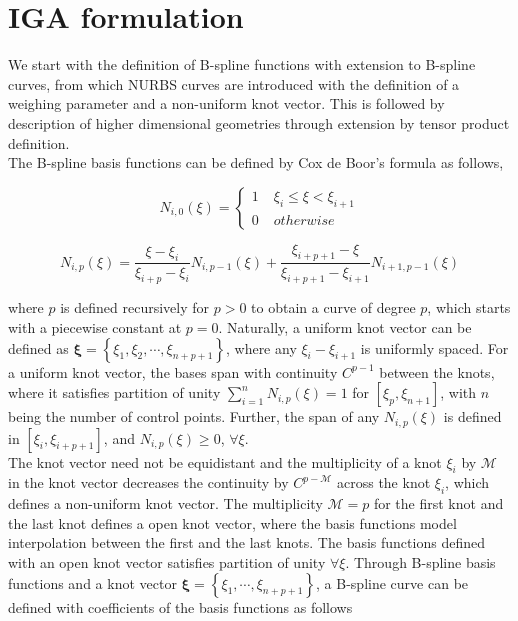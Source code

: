 \chapter{IGA formulation}
\cite{ha2015}
We start with the definition of B-spline functions with extension to B-spline curves, from which NURBS curves are introduced with the definition of a weighing parameter and a non-uniform knot vector. This is followed by description of higher dimensional geometries through extension by tensor product definition.\\
 
 The B-spline basis functions can be defined by Cox de Boor's formula as follows,
 
\begin{equation}
{N_{i,0}\left( \xi  \right)} = \left\{ {\begin{array}{cl}
   1 & {\;{\xi _i} \le \xi  < {\xi _{i + 1}}}  \\
   0 & {\;otherwise}
\end{array}} \right.
\end{equation}

\begin{equation}
{N_{i,p}\left( \xi  \right)} = \frac{{\xi  - \xi_{i} }}{{{\xi _{i + p}} - {\xi _i}}}{N_{i,p - 1}\left( \xi  \right)} + \frac{{{\xi _{i + p + 1}} - \xi }}{{{\xi _{i + p + 1}} - {\xi _{i + 1}}}}{N_{i + 1,p - 1}\left( \xi  \right)}
\end{equation}

where $p$ is defined recursively for $p>0$ to obtain a curve of degree $p$, which starts with a piecewise constant at $p=0$. Naturally, a uniform knot vector can be defined as  $\bm \xi  = \left\{ {{\xi _1},{\xi _2}, \cdots ,{\xi _{n + p + 1}}} \right\}$, where any $\xi_i - \xi_{i+1}$ is uniformly spaced.  
For a uniform knot vector, the bases span with continuity $C^{p-1}$ between the knots, where it satisfies partition of unity $\sum_{i=1}^{n} {N_{i,p}\left( \xi  \right)} = 1$ for $[\xi _p,\xi _{n+1}]$, with $n$ being the number of control points. Further, the span of any ${N_{i,p}\left( \xi  \right)}$ is defined in $[\xi_i,\xi_{i+p+1}]$, and ${N_{i,p}\left( \xi  \right)} \geq 0$, $\forall \xi$.\\

The knot vector need not be equidistant and the multiplicity  of a knot $\xi _i$ by $\mathcal{M}$ in the knot vector decreases the continuity by $C^{p-\mathcal{M}}$ across the knot $\xi _i$,  which defines a non-uniform knot vector. 
The multiplicity $\mathcal{M}=p$ for the first knot and the last knot defines a open knot vector, where the basis functions model interpolation between the first and the last knots. 
The basis functions defined with an open knot vector satisfies partition of unity $\forall \xi$. 
Through B-spline basis functions and a knot vector $\bm \xi  = \left\{ {{\xi _1}, \cdots ,{\xi _{n + p + 1}}} \right\}$, a B-spline curve can be defined with coefficients of the basis functions as follows 

